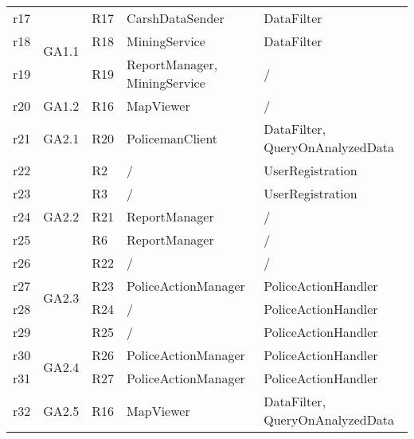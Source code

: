 \begin{table}[h!]
\begin{tabular}{|l|l|l|l|l|}
			r17					&\multirow{3}{*}{GA1.1}	&   	R17 								&  CarshDataSender									&DataFilter\\\cline{3-5}\cline{0-0}
			r18					&											&   	R18 								&  MiningService										&DataFilter\\\cline{3-5}\cline{0-0}
			r19					&											&   	R19 								&  ReportManager, MiningService			&/\\\cline{3-5}\cline{0-0} \hline
											
 			r20					&\multirow{1}{*}{GA1.2}	&   	R16 								&  MapViewer												&/\\\cline{3-5}\cline{0-0} \hline
 	
 			r21					&\multirow{1}{*}{GA2.1}	&   	R20 								& PolicemanClient 										&DataFilter, QueryOnAnalyzedData\\\cline{3-5}\cline{0-0} \hline
 	
 			r22					&\multirow{5}{*}{GA2.2}	&   	R2 								&  /																&UserRegistration\\\cline{3-5}\cline{0-0} 
 			r23					&											& 		R3 								&  /																&UserRegistration\\\cline{3-5}\cline{0-0} 
 			r24					&											&		R21 								&  ReportManager										&/\\\cline{3-5}\cline{0-0}
 			r25					&											&		R6 								&  ReportManager										&/\\\cline{3-5}\cline{0-0}
 			r26					&											&		R22 								&  /																&/\\\cline{3-5}\cline{0-0}\hline
 									
 			r27					&\multirow{2}{*}{GA2.3}	&  	R23 								&  PoliceActionManager							&PoliceActionHandler\\\cline{3-5}\cline{0-0}
 			r28					&											&  	R24 								&  /																&PoliceActionHandler\\\cline{3-5}\cline{0-0} 
 			r29					&											&  	R25 								&  /																&PoliceActionHandler\\\cline{3-5}\cline{0-0} \hline
 											
 			r30					&\multirow{2}{*}{GA2.4}	&  	R26 								&  PoliceActionManager										&PoliceActionHandler\\\cline{3-5}\cline{0-0}
 			r31					&											&  	R27 								&  PoliceActionManager							&PoliceActionHandler\\\cline{3-5}\cline{0-0} \hline
 											
 			r32					&\multirow{1}{*}{GA2.5}	&  	R16 								&  MapViewer											&DataFilter, QueryOnAnalyzedData\\\cline{3-5}\cline{0-0}\hline

\end{tabular}
	\end{table}

